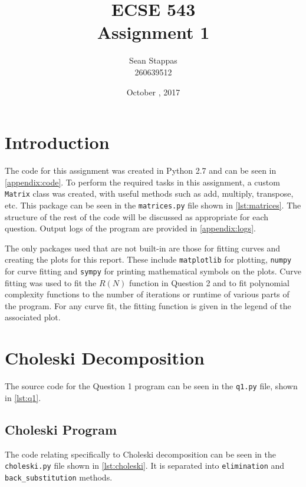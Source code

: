 \documentclass[a4paper,titlepage]{article}
\title{\textbf{ECSE 543 \\ Assignment 1}}
\author{Sean Stappas \\ 260639512}
\date{October \nth{21}, 2017}
\begin{document}
	\sloppy
	\maketitle
	
	\tableofcontents
	
	
	\twocolumn
	
	\section*{Introduction}
	
	The code for this assignment was created in Python 2.7 and can be seen in \autoref{appendix:code}. To perform the required tasks in this assignment, a custom \texttt{Matrix} class was created, with useful methods such as add, multiply, transpose, etc. This package can be seen in the \texttt{matrices.py} file shown in \autoref{lst:matrices}. The structure of the rest of the code will be discussed as appropriate for each question. Output logs of the program are provided in \autoref{appendix:logs}.
	
	The only packages used that are not built-in are those for fitting curves and creating the plots for this report. These include \texttt{matplotlib} for plotting, \texttt{numpy} for curve fitting and \texttt{sympy} for printing mathematical symbols on the plots. Curve fitting was used to fit the $R(N)$ function in Question 2 and to fit polynomial complexity functions to the number of iterations or runtime of various parts of the program. For any curve fit, the fitting function is given in the legend of the associated plot.
	
	\section{Choleski Decomposition}
	
	The source code for the Question 1 program can be seen in the \texttt{q1.py} file, shown in \autoref{lst:q1}.
	
	\subsection{Choleski Program}
	
	The code relating specifically to Choleski decomposition can be seen in the \texttt{choleski.py} file shown in \autoref{lst:choleski}. It is separated into \texttt{elimination} and \texttt{back_substitution} methods.
	
\end{document}
